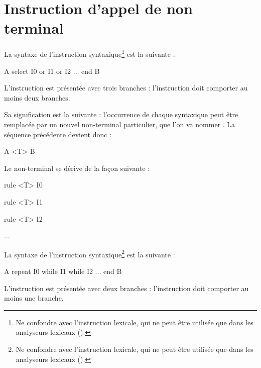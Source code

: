 \section{Instruction d'appel de non terminal}






La syntaxe de l'instruction  syntaxique\footnote{Ne confondre avec l'instruction  lexicale, qui ne peut être utilisée que dans les analyseurs lexicaux ().} est la suivante :
\begin{galgascode}
A
select
  I0
or
  I1
or
  I2
...
end
B
\end{galgascode}

L'instruction est présentée avec trois branches  : l'instruction doit comporter au moins deux branches.

Sa signification est la suivante : l'occurrence de chaque  syntaxique peut être remplacée par un nouvel non-terminal particulier, que l'on va nommer . La séquence précédente devient donc :
\begin{galgascode}
A
<T>
B
\end{galgascode}

Le non-terminal  se dérive de la façon suivante :
\begin{galgascode}
rule <T> { I0 }

rule <T> { I1 }

rule <T> { I2 }

...
\end{galgascode}








La syntaxe de l'instruction  syntaxique\footnote{Ne confondre avec l'instruction  lexicale, qui ne peut être utilisée que dans les analyseurs lexicaux ().} est la suivante :
\begin{galgascode}
A
repeat
  I0
while
  I1
while
  I2
...
end
B
\end{galgascode}

L'instruction est présentée avec deux branches  : l'instruction doit comporter au moins une branche.

